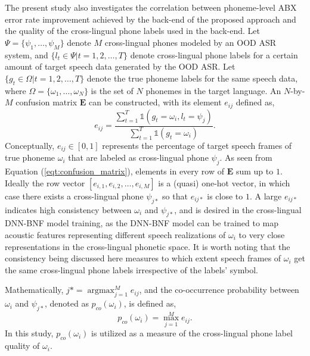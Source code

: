 \documentclass[transmag]{IEEEtran}
\DeclareMathOperator*{\argmax}{argmax} %
\begin{document}
The present study also investigates the correlation between phoneme-level ABX error rate improvement achieved by the back-end of the proposed approach and the quality of the cross-lingual phone labels used in the back-end.
Let $\Psi = \{\psi_1, \ldots, \psi_M\}$ denote $M$ cross-lingual phones modeled by an OOD ASR system, and $\{l_t \in \Psi | t=1,2,\ldots, T\}$ denote cross-lingual phone labels for a certain amount of target speech data generated by the OOD ASR.  Let $\{g_t \in \Omega | t=1,2,\ldots, T \}$ denote the true phoneme labels for the same speech data, where $\Omega = \{\omega_1, \ldots, \omega_N\}$ is the set of $N$ phonemes in the target language.  An $N$-by-$M$ confusion matrix $\bm{E}$ can be constructed, with its element $e_{ij}$ defined as,
\begin{equation}
    e_{ij} = \frac{\sum_{t=1}^{T} \mathbb{1} (g_t = \omega_i, l_t =\psi_j)}{\sum_{t=1}^{T} \mathbb{1} (g_t = \omega_i)}.
    \label{eqt:confusion_matrix}
\end{equation}
Conceptually, $e_{ij} \in [0,1]$ represents the percentage of target speech frames of true phoneme $\omega_i$ that are labeled as cross-lingual phone $\psi_j$. 
% 
As seen from Equation (\ref{eqt:confusion_matrix}), elements in every row of $\bm{E}$ sum up to $1$. Ideally the row vector $[e_{i,1},e_{i,2},\ldots, e_{i,M}]$ is a (quasi) one-hot vector, in which case there exists a cross-lingual phone $\psi_{j*}$ so that $e_{ij*}$ is close to $1$. 
A large $e_{ij*}$ indicates 
  high consistency between  $\omega_i$ and $\psi_{j*}$, and is desired in the cross-lingual DNN-BNF model training, as the DNN-BNF model can be trained to map acoustic features representing different speech realizations of $\omega_i$ to very close representations in the cross-lingual phonetic space.  It is worth noting that the consistency being discussed here measures to which extent speech frames of $\omega_i$ get the same cross-lingual phone labels irrespective of the labels’ symbol.

Mathematically,   $j* = \argmax_{j=1}^{M} e_{ij}$, and the co-occurrence probability between $\omega_i$ and $\psi_{j*}$, denoted as $p_{co} (\omega_i)$, is defined as,
\begin{equation}
     p_{co} (\omega_i) = \max_{j=1}^{M} e_{ij}.
    \label{eqt:p_co}
\end{equation}
In this study, $p_{co} (\omega_i)$ is  utilized  as a measure of the  cross-lingual phone label quality of $\omega_i$.
\end{document}
